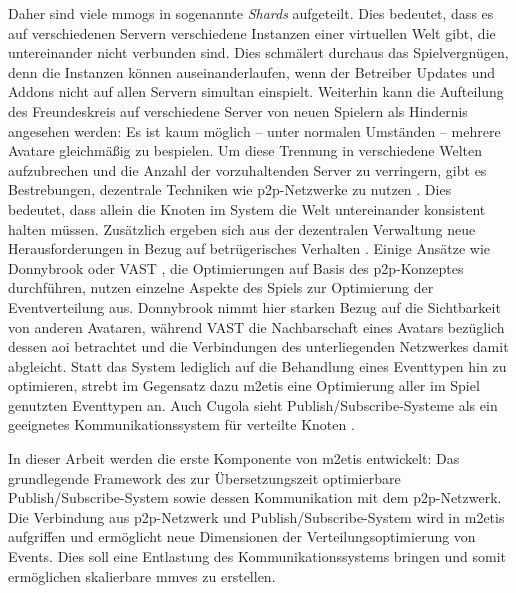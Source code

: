 Daher sind viele \acp{mmog} in sogenannte \emph{Shards} aufgeteilt. Dies bedeutet, dass es auf verschiedenen Servern verschiedene Instanzen einer virtuellen Welt gibt, die untereinander nicht verbunden sind. Dies schmälert durchaus das Spielvergnügen, denn die Instanzen können auseinanderlaufen, wenn der Betreiber Updates und Addons nicht auf allen Servern simultan einspielt. Weiterhin kann die Aufteilung des Freundeskreis auf verschiedene Server von neuen Spielern als Hindernis angesehen werden: Es ist kaum möglich -- unter normalen Umständen -- mehrere Avatare gleichmäßig zu bespielen. Um diese Trennung in verschiedene Welten aufzubrechen und die Anzahl der vorzuhaltenden Server zu verringern, gibt es Bestrebungen, dezentrale Techniken wie \ac{p2p}-Netzwerke zu nutzen \cite{Knutsson2004Peertopeer, Triebel2008Peertopeer}. Dies bedeutet, dass allein die Knoten im System die Welt untereinander konsistent halten müssen. Zusätzlich ergeben sich aus der dezentralen Verwaltung neue Herausforderungen in Bezug auf betrügerisches Verhalten \cite{Kabus2007Design}. Einige Ansätze wie Donnybrook \cite{Bharambe2008Donnybrook} oder VAST \cite{Backhaus2007Voronoibased}, die Optimierungen auf Basis des \ac{p2p}-Konzeptes durchführen, nutzen einzelne Aspekte des Spiels zur Optimierung der Eventverteilung aus. Donnybrook nimmt hier starken Bezug auf die Sichtbarkeit von anderen Avataren, während VAST die Nachbarschaft eines Avatars bezüglich dessen \ac{aoi} betrachtet und die Verbindungen des unterliegenden Netzwerkes damit abgleicht. Statt das System lediglich auf die Behandlung eines Eventtypen hin zu optimieren, strebt im Gegensatz dazu \ac{m2etis} eine Optimierung aller im Spiel genutzten Eventtypen an. Auch Cugola sieht Publish/Subscribe-Systeme als ein geeignetes Kommunikationssystem für verteilte Knoten \cite{Cugola2002Using}.



In dieser Arbeit werden die erste Komponente von \ac{m2etis} entwickelt: Das grundlegende Framework des zur Übersetzungszeit optimierbare Publish/Subscribe-System sowie dessen Kommunikation mit dem \ac{p2p}-Netzwerk. Die Verbindung aus \ac{p2p}-Netzwerk und Publish/Subscribe-System wird in \ac{m2etis} aufgriffen und ermöglicht neue Dimensionen der Verteilungsoptimierung von Events. Dies soll eine Entlastung des Kommunikationssystems bringen und somit ermöglichen skalierbare \acp{mmve} zu erstellen.

